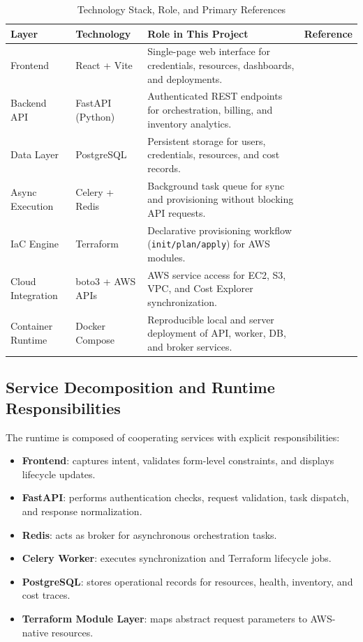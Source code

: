 \begin{table}[h]
\centering
\caption{Technology Stack, Role, and Primary References}
\label{tab:techstack}
\begin{tabular}{|p{2.6cm}|p{2.7cm}|p{4.2cm}|p{2.7cm}|}
\hline
\textbf{Layer} & \textbf{Technology} & \textbf{Role in This Project} & \textbf{Reference} \\ \hline
Frontend & React + Vite & Single-page web interface for credentials, resources, dashboards, and deployments. & \cite{react_docs_2026, vite_docs_2026} \\ \hline
Backend API & FastAPI (Python) & Authenticated REST endpoints for orchestration, billing, and inventory analytics. & \cite{fastapi_docs_2026} \\ \hline
Data Layer & PostgreSQL & Persistent storage for users, credentials, resources, and cost records. & \cite{postgresql_docs_2026} \\ \hline
Async Execution & Celery + Redis & Background task queue for sync and provisioning without blocking API requests. & \cite{celery_docs, redis_docs_2026} \\ \hline
IaC Engine & Terraform & Declarative provisioning workflow (\texttt{init/plan/apply}) for AWS modules. & \cite{hashicorp2024terraform} \\ \hline
Cloud Integration & boto3 + AWS APIs & AWS service access for EC2, S3, VPC, and Cost Explorer synchronization. & \cite{boto3_docs_2026, aws_ec2_api_docs_2026} \\ \hline
Container Runtime & Docker Compose & Reproducible local and server deployment of API, worker, DB, and broker services. & \cite{docker_docs_2026} \\ \hline
\end{tabular}
\end{table}

\subsection{Service Decomposition and Runtime Responsibilities}
The runtime is composed of cooperating services with explicit responsibilities:
\begin{itemize}
    \item \textbf{Frontend}: captures intent, validates form-level constraints, and displays lifecycle updates.
    \item \textbf{FastAPI}: performs authentication checks, request validation, task dispatch, and response normalization.
    \item \textbf{Redis}: acts as broker for asynchronous orchestration tasks.
    \item \textbf{Celery Worker}: executes synchronization and Terraform lifecycle jobs.
    \item \textbf{PostgreSQL}: stores operational records for resources, health, inventory, and cost traces.
    \item \textbf{Terraform Module Layer}: maps abstract request parameters to AWS-native resources.
\end{itemize}

